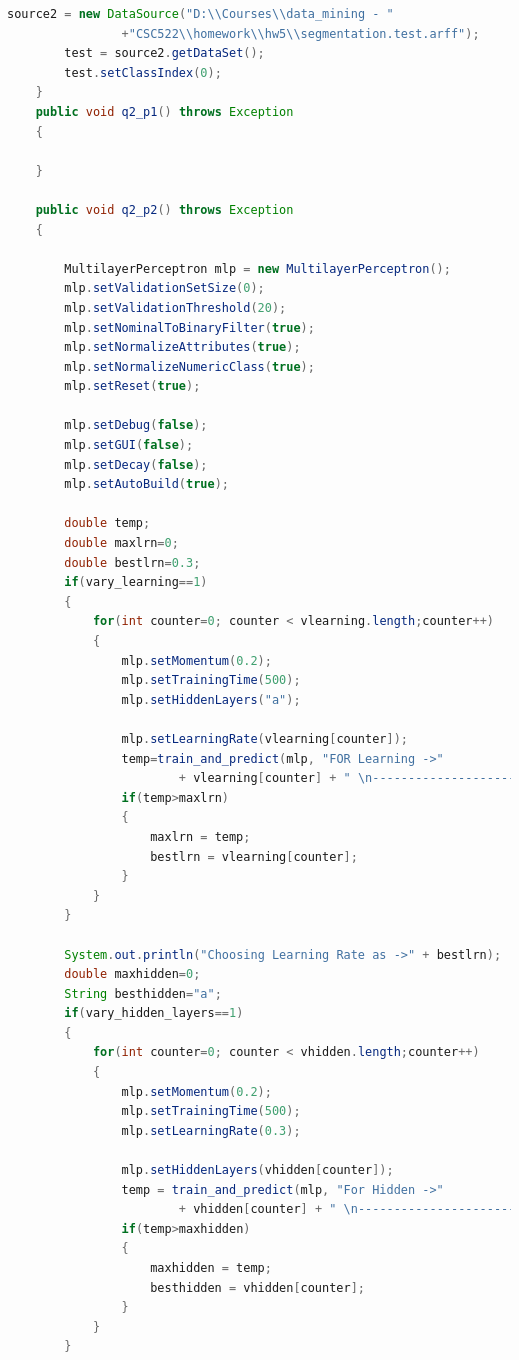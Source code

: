 \documentclass[fontsize=10pt,DIV=14]{scrartcl}
\begin{document}
\begin{itemize}
\begin{lstlisting}[language=Java,frame=single]
        source2 = new DataSource("D:\\Courses\\data_mining - "
                +"CSC522\\homework\\hw5\\segmentation.test.arff");
        test = source2.getDataSet();
        test.setClassIndex(0);
    }
    public void q2_p1() throws Exception
    {
        
    }
    
    public void q2_p2() throws Exception
    {
        
        MultilayerPerceptron mlp = new MultilayerPerceptron();
        mlp.setValidationSetSize(0);
        mlp.setValidationThreshold(20);
        mlp.setNominalToBinaryFilter(true);
        mlp.setNormalizeAttributes(true);
        mlp.setNormalizeNumericClass(true);
        mlp.setReset(true);
        
        mlp.setDebug(false);
        mlp.setGUI(false);
        mlp.setDecay(false);
        mlp.setAutoBuild(true);
        
        double temp;
        double maxlrn=0;
        double bestlrn=0.3;
        if(vary_learning==1)
        {
            for(int counter=0; counter < vlearning.length;counter++)
            {
                mlp.setMomentum(0.2);
                mlp.setTrainingTime(500);
                mlp.setHiddenLayers("a");
                
                mlp.setLearningRate(vlearning[counter]);
                temp=train_and_predict(mlp, "FOR Learning ->" 
                        + vlearning[counter] + " \n---------------------------");
                if(temp>maxlrn)
                {
                    maxlrn = temp;
                    bestlrn = vlearning[counter];
                }
            }
        }
        
        System.out.println("Choosing Learning Rate as ->" + bestlrn);
        double maxhidden=0;
        String besthidden="a";
        if(vary_hidden_layers==1)
        {
            for(int counter=0; counter < vhidden.length;counter++)
            {
                mlp.setMomentum(0.2);
                mlp.setTrainingTime(500);
                mlp.setLearningRate(0.3);
                
                mlp.setHiddenLayers(vhidden[counter]);
                temp = train_and_predict(mlp, "For Hidden ->" 
                        + vhidden[counter] + " \n---------------------------");
                if(temp>maxhidden)
                {
                    maxhidden = temp;
                    besthidden = vhidden[counter];
                }
            }
        }
        

\end{lstlisting}
\end{itemize}
\end{document}
